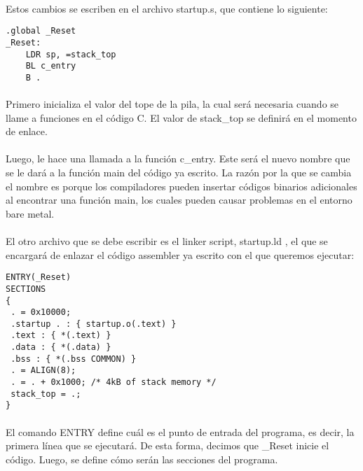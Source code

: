 \documentclass{article}
\begin{document}
\paragraph{}
Estos cambios se escriben en el archivo startup.s, que contiene lo siguiente:\cite{RedHatLinker1}\cite{RedHatLinker2}

\begin{lstlisting}
.global _Reset
_Reset:
    LDR sp, =stack_top
    BL c_entry
    B .
\end{lstlisting}

\paragraph{}
Primero inicializa el valor del tope de la pila, la cual ser\'a necesaria cuando se llame a funciones en el c\'odigo C. El valor de stack\_top se definir\'a en el momento de enlace. 

\paragraph{}
Luego, le hace una llamada a la funci\'on c\_entry. Este ser\'a el nuevo nombre que se le dar\'a a la funci\'on main del c\'odigo ya escrito. La raz\'on por la que se cambia el nombre es porque los compiladores pueden insertar c\'odigos binarios adicionales al encontrar una funci\'on main, los cuales pueden causar problemas en el entorno bare metal.\cite{DwelchReadme}

\paragraph{}
El otro archivo que se debe escribir es el linker script, startup.ld , el que se encargar\'a de enlazar el c\'odigo assembler ya escrito con el que queremos ejecutar:

\begin{lstlisting}
ENTRY(_Reset)
SECTIONS
{
 . = 0x10000;
 .startup . : { startup.o(.text) }
 .text : { *(.text) }
 .data : { *(.data) }
 .bss : { *(.bss COMMON) }
 . = ALIGN(8);
 . = . + 0x1000; /* 4kB of stack memory */
 stack_top = .;
}
\end{lstlisting}

\paragraph{}
El comando ENTRY define cu\'al es el punto de entrada del programa, es decir, la primera l\'inea que se ejecutar\'a. De esta forma, decimos que \_Reset inicie el c\'odigo. Luego, se define c\'omo ser\'an las secciones del programa.
\end{document}
